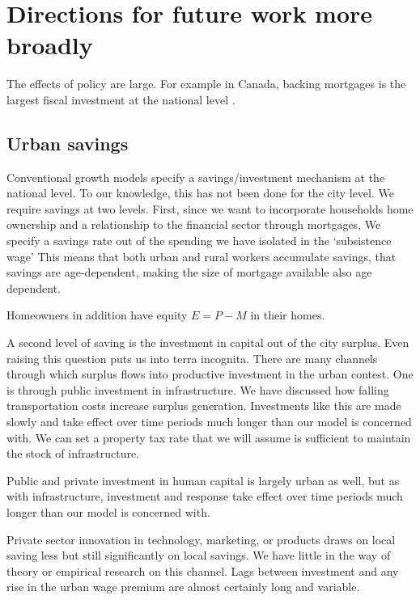 \section{Directions for future work more broadly}


The effects of policy are large. For example in Canada, backing mortgages is the largest fiscal investment at the national level \cite{nemtinFinancializationHousingSocial2021}.

\subsection{Urban savings}

Conventional growth models specify a savings/investment mechanism at the national level. To our knowledge, this has not been done for the city level. We require  savings at two levels. First, since we want to incorporate  households home ownership and a relationship to the financial sector through mortgages, We specify a savings rate out of the spending we have isolated in the `subsistence wage' This means that both urban and rural workers accumulate savings, that savings are age-dependent, making the size of mortgage available also age dependent. 

Homeowners in addition have equity $E=P-M$ in their homes. %

A second level of saving is the  investment in capital out of the city surplus. Even raising this question puts us into terra incognita. There are many  channels through which surplus flows into productive investment in the urban contest. One is through public investment in infrastructure. We have discussed how falling transportation costs increase surplus generation. Investments like this are made slowly and take effect over time periods much longer than our model is concerned with.  We can set a property tax rate   that we will assume is sufficient to maintain the stock of infrastructure.

Public and private investment in human capital is largely urban as well, but as with infrastructure, investment and response take effect over time periods much longer than our model is concerned with. 

Private sector innovation in technology, marketing, or products draws on local saving less but still significantly on local savings. We have little in the way of theory or empirical research on this channel. Lags between investment and any rise in the urban wage premium are almost certainly long and variable. 

